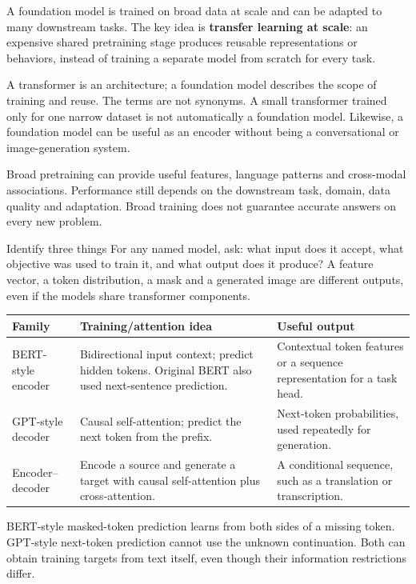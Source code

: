 \documentclass[11pt]{article}
\begin{document}
\tableofcontents\clearpage

A foundation model is trained on broad data at scale and can be adapted to many downstream tasks. The key idea is \textbf{transfer learning at scale}: an expensive shared pretraining stage produces reusable representations or behaviors, instead of training a separate model from scratch for every task.

A transformer is an architecture; a foundation model describes the scope of training and reuse. The terms are not synonyms. A small transformer trained only for one narrow dataset is not automatically a foundation model. Likewise, a foundation model can be useful as an encoder without being a conversational or image-generation system.

Broad pretraining can provide useful features, language patterns and cross-modal associations. Performance still depends on the downstream task, domain, data quality and adaptation. Broad training does not guarantee accurate answers on every new problem.

\begin{keyidea}{Identify three things}
For any named model, ask: what input does it accept, what objective was used to train it, and what output does it produce? A feature vector, a token distribution, a mask and a generated image are different outputs, even if the models share transformer components.
\end{keyidea}

\begin{longtable}{@{}P{.23\textwidth}P{.33\textwidth}P{.34\textwidth}@{}}
\toprule Family & Training/attention idea & Useful output\\\midrule\endhead
BERT-style encoder & Bidirectional input context; predict hidden tokens. Original BERT also used next-sentence prediction. & Contextual token features or a sequence representation for a task head.\\
GPT-style decoder & Causal self-attention; predict the next token from the prefix. & Next-token probabilities, used repeatedly for generation.\\
Encoder--decoder & Encode a source and generate a target with causal self-attention plus cross-attention. & A conditional sequence, such as a translation or transcription.\\\bottomrule
\end{longtable}
BERT-style masked-token prediction learns from both sides of a missing token. GPT-style next-token prediction cannot use the unknown continuation. Both can obtain training targets from text itself, even though their information restrictions differ.
\end{document}
